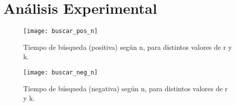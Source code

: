 \section{Análisis Experimental}

\begin{figure}
  \begin{center}
  \texttt{[image: buscar\_pos\_n]}
  \caption{Tiempo de búsqueda (positiva)
    según n, para distintos valores de r y k.}
  \label{fig:buscar-pos-segun-n}
  \end{center}
\end{figure}


\begin{figure}
  \begin{center}
  \texttt{[image: buscar\_neg\_n]}
  \caption{Tiempo de búsqueda (negativa)
    según n, para distintos valores de r y k.}
  \label{fig:buscar-neg-segun-n}
  \end{center}
\end{figure}

